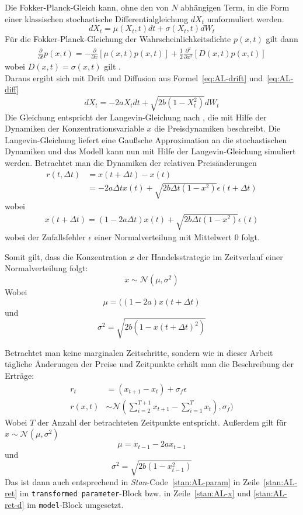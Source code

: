 \documentclass[ngerman]{ttlab-qualify}
\begin{document}
Die Fokker-Planck-Gleich kann, ohne den von $N$ abhängigen Term, in die Form einer klassischen stochastische Differentialgleichung $dX_t$ umformuliert werden.
\[dX_t =\mu(X_t,t)dt +\sigma(X_t,t)dW_t\]
Für die Fokker-Planck-Gleichung der Wahrscheinlichkeitsdichte $p(x,t)$ gilt dann
\begin{align}
\frac{\partial}{\partial t}p(x,t)=-\frac{\partial}{\partial x}[\mu(x,t)p(x,t)]+\frac{1}{2}\frac{\partial^2}{\partial x^2}[D(x,t)p(x,t)] 
\end{align}
wobei $D(x,t)=\sigma(x,t)$ gilt \parencite{bertschinger:2019}.\\
Daraus ergibt sich mit Drift und Diffusion aus Formel~\ref{eq:AL-drift} und~\ref{eq:AL-diff}
\[dX_t =-2aX_t dt+\sqrt{2b(1-X_t^2)}dW_t\]
Die Gleichung entspricht der Langevin-Gleichung nach \parencite{AL:2008}, die mit Hilfe der Dynamiken der Konzentrationsvariable $x$ die Preisdynamiken beschreibt.
Die Langevin-Gleichung liefert eine Gaußsche Approximation an die stochastischen Dynamiken und das Modell kann nun mit Hilfe der Langevin-Gleichung simuliert werden. 
Betrachtet man die Dynamiken der relativen Preisänderungen
\begin{align}
r(t,\Delta t) &= x(t+\Delta t)-x(t)\nonumber \\
&=-2a\Delta tx(t)+\sqrt{2b\Delta t(1-x^2)}\epsilon(t+\Delta t)\nonumber 
\end{align}
wobei 
\begin{align}
\label{eq:AL-langevin}
x(t+\Delta t) = (1-2a\Delta t)x(t) + \sqrt{2b\Delta t(1-x^2)}\epsilon(t)
\end{align}
wobei der Zufallsfehler $\epsilon$ einer Normalverteilung mit Mittelwert 0 folgt.

Somit gilt, dass die Konzentration $x$ der Handelsstrategie im Zeitverlauf einer Normalverteilung folgt:
\[x\sim\mathcal{N}(\mu, \sigma^2)\]
Wobei
\[\mu = ((1-2a)x(t+\Delta t)\]
und 
\[\sigma^2 = \sqrt{2b(1-x(t+\Delta t)^2)}\]

Betrachtet man keine marginalen Zeitschritte, sondern wie in dieser Arbeit tägliche Änderungen der Preise und Zeitpunkte erhält man die Beschreibung der Erträge:
\begin{align}
r_t & = (x_{t+1}-x_t)+\sigma_f\epsilon \nonumber \\
r(x,t) &\sim \mathcal{N}\left(\sum_{i=2}^{T+1} x_{t+1}-\sum_{i=1}^T x_t\right),\sigma_f)\nonumber 
\end{align}
Wobei $T$ der Anzahl der betrachteten Zeitpunkte entspricht.
Außerdem gilt für $x\sim\mathcal{N}(\mu,\sigma^2)$
\[\mu = x_{t-1}-2ax_{t-1}\]
und 
\[\sigma^2 = \sqrt{2b(1-x_{t-1}^2)}\]
Das ist dann auch entsprechend in \textit{Stan}-Code~\ref{stan:AL-param} in Zeile~\ref{stan:AL-ret} im \verb|transformed parameter|-Block bzw. in Zeile~\ref{stan:AL-x} und \ref{stan:AL-ret-d} im \verb|model|-Block umgesetzt.
\end{document}
